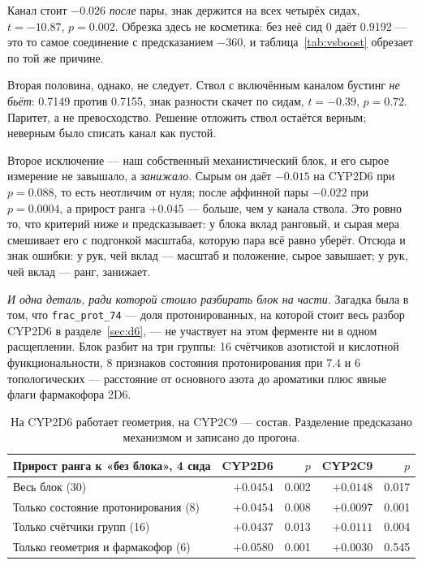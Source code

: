 Канал стоит $-0.026$ \emph{после} пары, знак держится на всех четырёх сидах, $t = -10.87$,
$p = 0.002$. Обрезка здесь не косметика: без неё сид 0 даёт 0.9192 --- это то самое соединение
с предсказанием $-360$, и таблица~\ref{tab:vsboost} обрезает по той же причине.

Вторая половина, однако, не следует. Ствол с включённым каналом бустинг \emph{не бьёт}: 0.7149
против 0.7155, знак разности скачет по сидам, $t = -0.39$, $p = 0.72$. Паритет, а не
превосходство. Решение отложить ствол остаётся верным; неверным было списать канал как пустой.

Второе исключение --- наш собственный механистический блок, и его сырое измерение не завышало,
а \emph{занижало}. Сырым он даёт $-0.015$ на CYP2D6 при $p = 0.088$, то есть неотличим от нуля;
после аффинной пары $-0.022$ при $p = 0.0004$, а прирост ранга $+0.045$ --- больше, чем у канала
ствола. Это ровно то, что критерий ниже и предсказывает: у блока вклад ранговый, и сырая мера
смешивает его с подгонкой масштаба, которую пара всё равно уберёт. Отсюда и знак ошибки: у рук,
чей вклад --- масштаб и положение, сырое завышает; у рук, чей вклад --- ранг, занижает.

\emph{И одна деталь, ради которой стоило разбирать блок на части.} Загадка была в том, что
\texttt{frac\_prot\_74} --- доля протонированных, на которой стоит весь разбор CYP2D6 в
разделе~\ref{sec:d6}, --- не участвует на этом ферменте ни в одном расщеплении. Блок разбит на
три группы: 16 счётчиков азотистой и кислотной функциональности, 8 признаков состояния
протонирования при 7.4 и 6 топологических --- расстояние от основного азота до ароматики плюс
явные флаги фармакофора 2D6.

\begin{table}[htbp]\centering\small
\begin{tabularx}{\textwidth}{@{}Xrrrr@{}}
\toprule
Прирост ранга к «без блока», 4 сида & CYP2D6 & $p$ & CYP2C9 & $p$ \\
\midrule
Весь блок (30) & $+0.0454$ & 0.002 & $+0.0148$ & 0.017 \\
Только состояние протонирования (8) & $+0.0454$ & 0.008 & $+0.0097$ & 0.001 \\
Только счётчики групп (16) & $+0.0437$ & 0.013 & $+0.0111$ & 0.004 \\
Только геометрия и фармакофор (6) & $\mathbf{+0.0580}$ & 0.001 & $+0.0030$ & 0.545 \\
\bottomrule
\end{tabularx}
\caption{На CYP2D6 работает геометрия, на CYP2C9 --- состав. Разделение предсказано механизмом
и записано до прогона.}
\label{tab:mechsplit}
\end{table}

